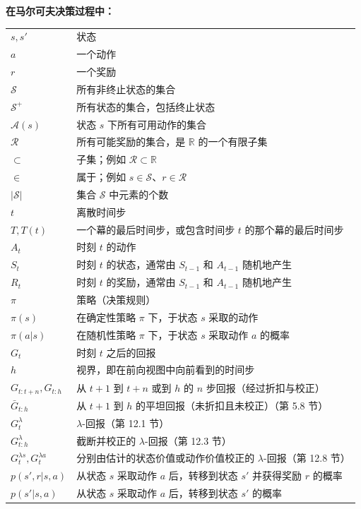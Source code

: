 \documentclass[UTF8, 12pt, fontset=fandol, oneside]{ctexart}
\begin{document}
\noindent\textbf{在马尔可夫决策过程中：}
\begin{longtable}{p{}p{}}
$s,s'$ & 状态 \\
$a$ & 一个动作 \\
$r$ & 一个奖励 \\
$\mathcal{S}$ & 所有非终止状态的集合 \\
$\mathcal{S}^+$ & 所有状态的集合，包括终止状态 \\
$\mathcal{A}(s)$ & 状态 $s$ 下所有可用动作的集合 \\
$\mathcal{R}$ & 所有可能奖励的集合，是 $\mathbb{R}$ 的一个有限子集 \\
$\subset$ & 子集；例如 $\mathcal{R}\subset\mathbb{R}$ \\
$\in$ & 属于；例如 $s\in\mathcal{S}$、$r\in\mathcal{R}$ \\
$|\mathcal{S}|$ & 集合 $\mathcal{S}$ 中元素的个数 \\
$t$ & 离散时间步 \\
$T,T(t)$ & 一个幕的最后时间步，或包含时间步 $t$ 的那个幕的最后时间步 \\
$A_t$ & 时刻 $t$ 的动作 \\
$S_t$ & 时刻 $t$ 的状态，通常由 $S_{t-1}$ 和 $A_{t-1}$ 随机地产生 \\
$R_t$ & 时刻 $t$ 的奖励，通常由 $S_{t-1}$ 和 $A_{t-1}$ 随机地产生 \\
$\pi$ & 策略（决策规则） \\
$\pi(s)$ & 在确定性策略 $\pi$ 下，于状态 $s$ 采取的动作 \\
$\pi(a|s)$ & 在随机性策略 $\pi$ 下，于状态 $s$ 采取动作 $a$ 的概率 \\
$G_t$ & 时刻 $t$ 之后的回报 \\
$h$ & 视界，即在前向视图中向前看到的时间步 \\
$G_{t:t+n},G_{t:h}$ & 从 $t+1$ 到 $t+n$ 或到 $h$ 的 $n$ 步回报（经过折扣与校正） \\
$\bar G_{t:h}$ & 从 $t+1$ 到 $h$ 的平坦回报（未折扣且未校正）（第 5.8 节） \\
$G_t^\lambda$ & $\lambda$-回报（第 12.1 节） \\
$G_{t:h}^\lambda$ & 截断并校正的 $\lambda$-回报（第 12.3 节） \\
$G_t^{\lambda s},G_t^{\lambda a}$ & 分别由估计的状态价值或动作价值校正的 $\lambda$-回报（第 12.8 节） \\
$p(s',r|s,a)$ & 从状态 $s$ 采取动作 $a$ 后，转移到状态 $s'$ 并获得奖励 $r$ 的概率 \\
$p(s'|s,a)$ & 从状态 $s$ 采取动作 $a$ 后，转移到状态 $s'$ 的概率 \\

\end{longtable}
\end{document}
